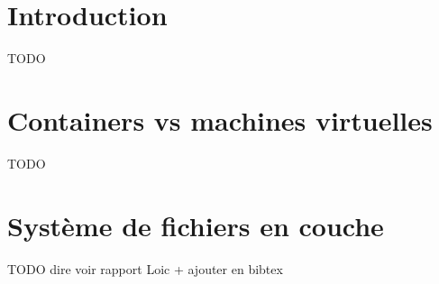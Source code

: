 \section{Introduction}

TODO

\section{Containers vs machines virtuelles}

TODO    

\section{Système de fichiers en couche}

TODO dire voir rapport Loic + ajouter en bibtex